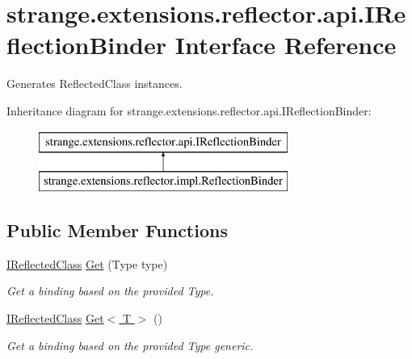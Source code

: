 \hypertarget{interfacestrange_1_1extensions_1_1reflector_1_1api_1_1_i_reflection_binder}{\section{strange.\-extensions.\-reflector.\-api.\-I\-Reflection\-Binder Interface Reference}
\label{interfacestrange_1_1extensions_1_1reflector_1_1api_1_1_i_reflection_binder}
}


Generates {\ttfamily Reflected\-Class} instances.  


Inheritance diagram for strange.\-extensions.\-reflector.\-api.\-I\-Reflection\-Binder\-:\begin{figure}[H]
\begin{center}
\leavevmode
\includegraphics[height=2.000000cm]{interfacestrange_1_1extensions_1_1reflector_1_1api_1_1_i_reflection_binder}
\end{center}
\end{figure}
\subsection*{Public Member Functions}
\begin{DoxyCompactItemize}
\item 
\hypertarget{interfacestrange_1_1extensions_1_1reflector_1_1api_1_1_i_reflection_binder_ae9c19cb1036c588e85eeb6366c7cdfeb}{\hyperlink{interfacestrange_1_1extensions_1_1reflector_1_1api_1_1_i_reflected_class}{I\-Reflected\-Class} \hyperlink{interfacestrange_1_1extensions_1_1reflector_1_1api_1_1_i_reflection_binder_ae9c19cb1036c588e85eeb6366c7cdfeb}{Get} (Type type)}\label{interfacestrange_1_1extensions_1_1reflector_1_1api_1_1_i_reflection_binder_ae9c19cb1036c588e85eeb6366c7cdfeb}

\begin{DoxyCompactList}\small\item\em Get a binding based on the provided Type. \end{DoxyCompactList}\item 
\hypertarget{interfacestrange_1_1extensions_1_1reflector_1_1api_1_1_i_reflection_binder_a97baa460e374709cba5d7ee08e667104}{\hyperlink{interfacestrange_1_1extensions_1_1reflector_1_1api_1_1_i_reflected_class}{I\-Reflected\-Class} \hyperlink{interfacestrange_1_1extensions_1_1reflector_1_1api_1_1_i_reflection_binder_a97baa460e374709cba5d7ee08e667104}{Get$<$ T $>$} ()}\label{interfacestrange_1_1extensions_1_1reflector_1_1api_1_1_i_reflection_binder_a97baa460e374709cba5d7ee08e667104}

\begin{DoxyCompactList}\small\item\em Get a binding based on the provided Type generic. \end{DoxyCompactList}\end{DoxyCompactItemize}


